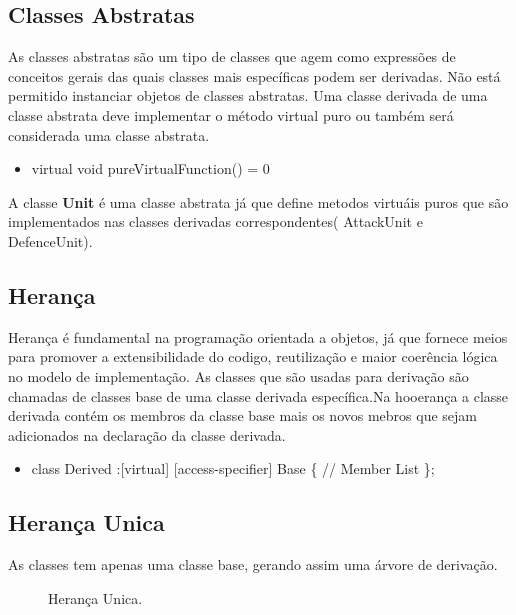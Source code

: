 \documentclass[rel_mlp]{iiufrgs}
\newcommand{\fonte}[1]{\\Fonte: {#1}}
\begin{document}
\subsection{Classes Abstratas}
As classes abstratas são um tipo de classes que agem como expressões de conceitos gerais das quais classes mais específicas podem ser derivadas. Não está permitido instanciar objetos de classes abstratas. 
Uma classe derivada de uma classe abstrata deve implementar o método virtual puro ou também será considerada uma classe abstrata.

 \begin{itemize}
 \item virtual void pureVirtualFunction() = 0  
 \end{itemize}  	
A classe \textbf{Unit} é uma classe abstrata já que define metodos virtuáis puros que são implementados nas classes derivadas correspondentes( AttackUnit e DefenceUnit).
\subsection{Herança}
Herança é fundamental na programação orientada a objetos, já que fornece meios para promover a extensibilidade do codigo, reutilização e maior coerência lógica no modelo de implementação. As classes que são usadas para derivação são chamadas de classes base de uma classe derivada específica.Na hooerança a classe derivada contém os membros da classe base mais os novos mebros que sejam adicionados na declaração da classe derivada.
 \begin{itemize}
 \item class Derived :[virtual] [access-specifier] Base
 \{ \bigbreak
 	\hspace{1cm} // Member List		
	\bigbreak
 \};  
 \end{itemize}  	
\subsection{Herança Unica} 	
As classes tem apenas uma classe base, gerando assim uma árvore de derivação.

\begin{figure}[htb]
    \centering
    \label{fig:figura2}
    \caption{Herança Unica.}
\end{figure}
\end{document}
